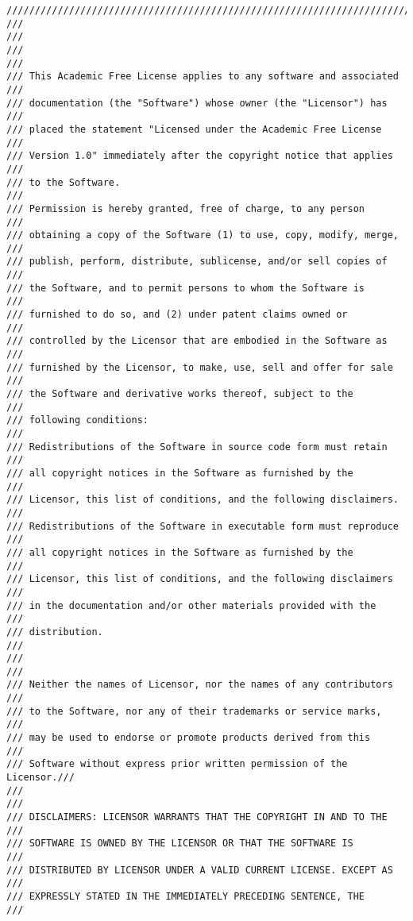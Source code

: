 \begin{verbatim}
/////////////////////////////////////////////////////////////////////////
///                                                                   ///
///                                                                   ///
/// This Academic Free License applies to any software and associated ///
/// documentation (the "Software") whose owner (the "Licensor") has   ///
/// placed the statement "Licensed under the Academic Free License    ///
/// Version 1.0" immediately after the copyright notice that applies  ///
/// to the Software.                                                  ///
/// Permission is hereby granted, free of charge, to any person       ///
/// obtaining a copy of the Software (1) to use, copy, modify, merge, ///
/// publish, perform, distribute, sublicense, and/or sell copies of   ///
/// the Software, and to permit persons to whom the Software is       ///
/// furnished to do so, and (2) under patent claims owned or          ///
/// controlled by the Licensor that are embodied in the Software as   ///
/// furnished by the Licensor, to make, use, sell and offer for sale  ///
/// the Software and derivative works thereof, subject to the         ///
/// following conditions:                                             ///
/// Redistributions of the Software in source code form must retain   ///
/// all copyright notices in the Software as furnished by the         ///
/// Licensor, this list of conditions, and the following disclaimers. ///
/// Redistributions of the Software in executable form must reproduce ///
/// all copyright notices in the Software as furnished by the         ///
/// Licensor, this list of conditions, and the following disclaimers  ///
/// in the documentation and/or other materials provided with the     ///
/// distribution.                                                     ///
///                                                                   ///
/// Neither the names of Licensor, nor the names of any contributors  ///
/// to the Software, nor any of their trademarks or service marks,    ///
/// may be used to endorse or promote products derived from this      ///
/// Software without express prior written permission of the Licensor.///
///                                                                   ///
/// DISCLAIMERS: LICENSOR WARRANTS THAT THE COPYRIGHT IN AND TO THE   ///
/// SOFTWARE IS OWNED BY THE LICENSOR OR THAT THE SOFTWARE IS         ///
/// DISTRIBUTED BY LICENSOR UNDER A VALID CURRENT LICENSE. EXCEPT AS  ///
/// EXPRESSLY STATED IN THE IMMEDIATELY PRECEDING SENTENCE, THE       ///

\end{verbatim}
